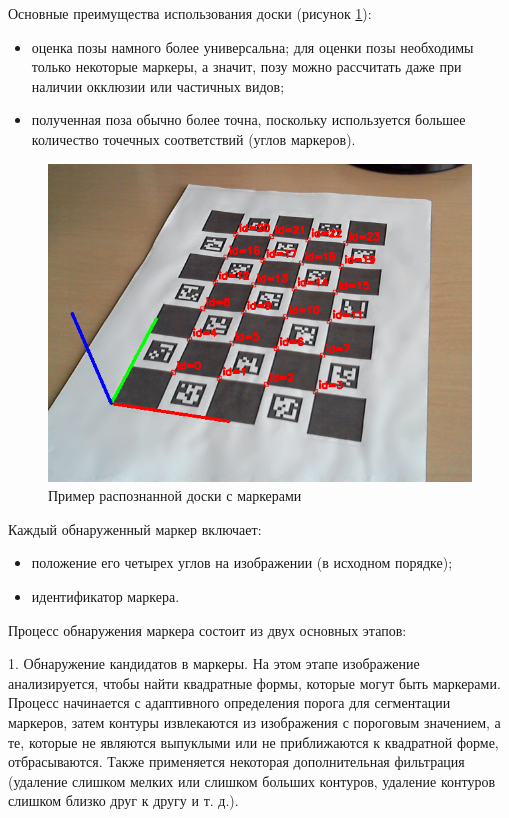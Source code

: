 Основные преимущества использования доски (рисунок \ref{fig:aruc}):
\begin{itemize}
\item оценка позы намного более универсальна; для оценки позы необходимы только некоторые маркеры, а значит, позу можно рассчитать даже при наличии окклюзии или частичных видов;
\item полученная поза обычно более точна, поскольку используется большее количество точечных соответствий (углов маркеров).
\end{itemize}
\begin{figure}[H]
	\centering
	\includegraphics[width=0.5\linewidth]{pics/aruc}
	\caption{Пример распознанной доски с маркерами
	}
	\label{fig:aruc}
\end{figure}

Каждый обнаруженный маркер включает:
\begin{itemize}
\item положение его четырех углов на изображении (в исходном порядке);
\item идентификатор маркера.
\end{itemize}

Процесс обнаружения маркера состоит из двух основных этапов:

1. Обнаружение кандидатов в маркеры. На этом этапе изображение анализируется, чтобы найти квадратные формы, которые могут быть маркерами. Процесс начинается с адаптивного определения порога для сегментации маркеров, затем контуры извлекаются из изображения с пороговым значением, а те, которые не являются выпуклыми или не приближаются к квадратной форме, отбрасываются. Также применяется некоторая дополнительная фильтрация (удаление слишком мелких или слишком больших контуров, удаление контуров слишком близко друг к другу и т. д.).

